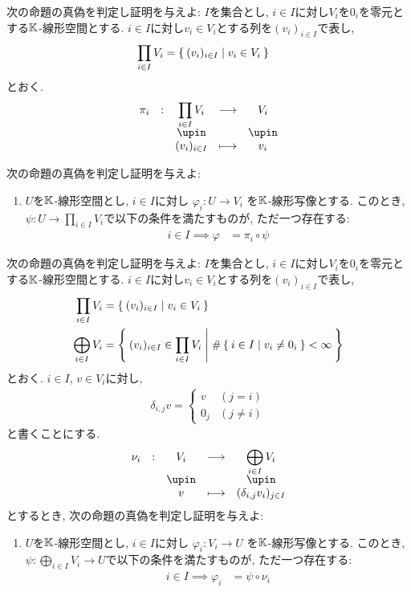 \begin{quiz}
  次の命題の真偽を判定し証明を与えよ:
  $I$を集合とし, $i\in I$に対し$V_i$を$0_{i}$を零元とする$\mathbb{K}$-線形空間とする.
  $i \in I$に対し$v_i\in V_i$とする列を$(v_i)_{i\in I}$で表し,
  \begin{align*}
    \prod_{i\in I} V_i &=\Set{(v_i)_{i\in I}|v_i\in V_i}
  \end{align*}
  とおく.
  \begin{align*}
    \shazo{\pi_i}{\prod_{i\in I} V_i}{V_i}
    {(v_i)_{i\in I}}{v_i}
  \end{align*}

  次の命題の真偽を判定し証明を与えよ:
  \begin{enumerate}
  \item
    $U$を$\mathbb{K}$-線形空間とし,
    $i\in I$に対し
    $\varphi_i\colon U\to V_i$
    を$\mathbb{K}$-線形写像とする.
    このとき,
    $\psi\colon U\to \prod_{i\in I} V_i$で以下の条件を満たすものが,
    ただ一つ存在する:
    \begin{align*}
      i\in I\implies \varphi&=\pi_i\circ\psi
    \end{align*}
  \end{enumerate}
\end{quiz}


\begin{quiz}
  次の命題の真偽を判定し証明を与えよ:
  $I$を集合とし, $i\in I$に対し$V_i$を$0_{i}$を零元とする$\mathbb{K}$-線形空間とする.
  $i \in I$に対し$v_i\in V_i$とする列を$(v_i)_{i\in I}$で表し,
  \begin{align*}
    \prod_{i\in I} V_i &=\Set{(v_i)_{i\in I}|v_i\in V_i}\\
    \bigoplus_{i\in I} V_i &=\Set{(v_i)_{i\in I} \in \prod_{i\in I} V_i|\#\Set{i\in I|v_i\neq 0_{i}}<\infty}
  \end{align*}
  とおく.
  $i\in I$,
  $v\in V_i$に対し,
  \begin{align*}
    \delta_{i,j}v=
    \begin{cases}
      v & (j=i)\\
      0_j& (j\neq i)
    \end{cases}
  \end{align*}
  と書くことにする.
  \begin{align*}
    \shazo{\nu_i}{V_i}{\bigoplus_{i\in I} V_i}
    {v}{(\delta_{i,j}v_i)_{j\in I}}
  \end{align*}
  とするとき,
  次の命題の真偽を判定し証明を与えよ:
  \begin{enumerate}
  \item
    $U$を$\mathbb{K}$-線形空間とし,
    $i\in I$に対し
    $\varphi_i\colon  V_i \to U$
    を$\mathbb{K}$-線形写像とする.
    このとき,
    $\psi\colon \bigoplus_{i\in I} V_i\to U$で以下の条件を満たすものが,
    ただ一つ存在する:
    \begin{align*}
      i\in I\implies \varphi_i&=\psi\circ\nu_i
    \end{align*}
  \end{enumerate}
\end{quiz}

